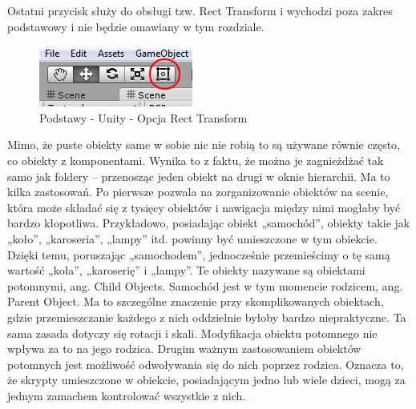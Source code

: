 \documentclass[12pt]{xmgr}
\begin{document}
Ostatni przycisk służy do obsługi tzw. Rect Transform i wychodzi poza zakres podstawowy i nie będzie omawiany w tym rozdziale.

\begin{figure}[!htb]
    \begin{center}
    \includegraphics[scale=0.4]{Screeny/rodzial5screeny/recttrans_option}
    \end{center}
    \caption{Podstawy - Unity - Opcja Rect Transform }
\end{figure}

Mimo, że puste obiekty same w sobie nic nie robią to są używane równie często, co obiekty z komponentami. Wynika to z faktu, że można je zagnieżdżać tak samo jak foldery – przenosząc jeden obiekt na drugi w oknie hierarchii. Ma to kilka zastosowań. Po pierwsze pozwala na zorganizowanie obiektów na scenie, która może składać się z tysięcy obiektów i nawigacja między nimi mogłaby być bardzo kłopotliwa. Przykładowo, posiadając obiekt „samochód”, obiekty takie jak „koło”, „karoseria”, „lampy” itd. powinny być umieszczone w tym obiekcie. Dzięki temu, poruszając „samochodem”, jednocześnie przemieścimy o tę samą wartość „koła”, „karoserię” i „lampy”. Te obiekty nazywane są obiektami potomnymi, ang. Child Objects. Samochód jest w tym momencie rodzicem, ang. Parent Object. Ma to szczególne znaczenie przy skomplikowanych obiektach, gdzie przemieszczanie każdego z nich oddzielnie byłoby bardzo niepraktyczne. Ta sama zasada dotyczy się rotacji i skali. Modyfikacja obiektu potomnego nie wpływa za to na jego rodzica. Drugim ważnym zastosowaniem obiektów potomnych jest możliwość odwoływania się do nich poprzez rodzica. Oznacza to, że skrypty umieszczone w obiekcie, posiadającym jedno lub wiele dzieci, mogą za jednym zamachem kontrolować wszystkie z nich.
\end{document}
